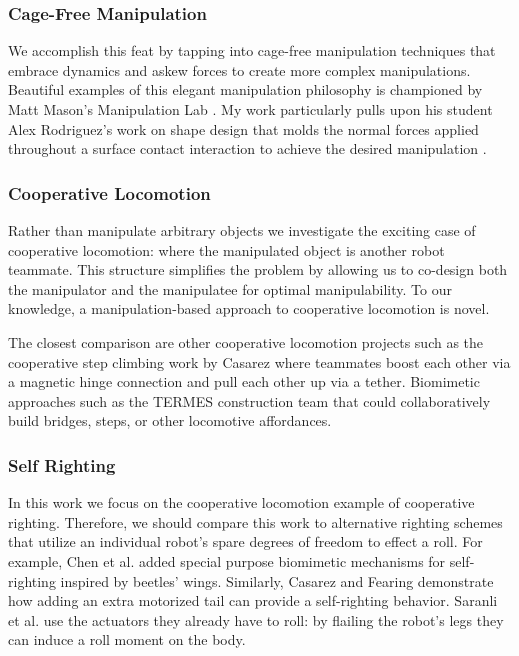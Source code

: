 \documentclass[letterpaper, 10 pt, conference]{ieeeconf}
\begin{document}
\subsubsection{Cage-Free Manipulation}
We accomplish this feat by tapping into cage-free manipulation techniques that embrace dynamics and askew forces to create more complex manipulations.
Beautiful examples of this elegant manipulation philosophy is championed by Matt Mason's Manipulation Lab \cite{lynch1999dynamic}\cite{dafle2014extrinsic}.
My work particularly pulls upon his student Alex Rodriguez's work on shape design that molds the normal forces applied throughout a surface contact interaction to achieve the desired manipulation \cite{rodriguez2013effector}.

\subsubsection{Cooperative Locomotion}
Rather than manipulate arbitrary objects we investigate the exciting case of cooperative locomotion: where the manipulated object is another robot teammate.
This structure simplifies the problem by allowing us to co-design both the manipulator and the manipulatee for optimal manipulability.
To our knowledge, a manipulation-based approach to cooperative locomotion is novel.

The closest comparison are other cooperative locomotion projects such as the cooperative step climbing work by Casarez \cite{casarez2016step} where teammates boost each other via a magnetic hinge connection and pull each other up via a tether.
Biomimetic approaches such as the TERMES \cite{werfel2014designing} construction team that could collaboratively build bridges, steps, or other locomotive affordances.

\subsubsection{Self Righting}
In this work we focus on the cooperative locomotion example of cooperative righting.
Therefore, we should compare this work to alternative righting schemes that utilize an individual robot's spare degrees of freedom to effect a roll.
For example, Chen et al. \cite{li2016cockroach} added special purpose biomimetic mechanisms for self-righting inspired by beetles' wings.
Similarly, Casarez and Fearing \cite{casarezTailRighting} demonstrate how adding an extra motorized tail can provide a self-righting behavior.
Saranli et al. \cite{saranli2004model} use the actuators they already have to roll: by flailing the robot's legs they can induce a roll moment on the body.
\end{document}
